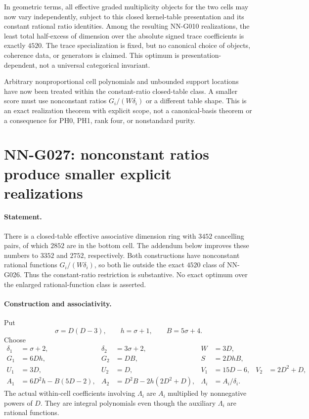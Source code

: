 In geometric terms, all effective graded multiplicity objects
for the two cells may now vary independently, subject to this
closed kernel-table presentation and its constant rational
ratio identities. Among the resulting NN-G010 realizations,
the least total half-excess of dimension over the absolute
signed trace coefficients is exactly $4520$. The trace
specialization is fixed, but no canonical choice of objects,
coherence data, or generators is claimed. This optimum is
presentation-dependent, not a universal categorical invariant.

Arbitrary nonproportional cell polynomials and
unbounded support locations have now been treated
within the constant-ratio closed-table class. A
smaller score must use nonconstant ratios
$G_i/(W\delta_i)$ or a different table shape.
This is an exact realization theorem with explicit
scope, not a canonical-basis theorem or a consequence
for PH0, PH1, rank four, or nonstandard purity.



\section{NN-G027: nonconstant ratios produce smaller explicit realizations}
\paragraph{Statement.}
There is a closed-table effective associative dimension ring
with $3452$ cancelling pairs, of which $2852$ are in the
bottom cell. The addendum below improves these numbers to
$3352$ and $2752$, respectively. Both constructions have
nonconstant rational functions
$G_i/(W\delta_i)$, so both lie outside the exact $4520$
class of NN-G026. Thus the constant-ratio restriction is
substantive. No exact optimum over the enlarged rational-function
class is asserted.

\paragraph{Construction and associativity.}
Put
\[
 \sigma=D(D-3),\qquad h=\sigma+1,\qquad B=5\sigma+4.
\]
Choose
\[
 \begin{aligned}
 \delta_1&=\sigma+2,&\delta_2&=3\sigma+2,&W&=3D,\\
 G_1&=6Dh,&G_2&=DB,&S&=2DhB,\\
 U_1&=3D,&U_2&=D,&V_1&=15D-6,&V_2&=2D^2+D,\\
 A_1&=6D^2h-B(5D-2),&
 A_2&=D^2B-2h(2D^2+D),&
 \Lambda_i&=A_i/\delta_i.
 \end{aligned}                                                       \tag{G027.1}
\]
The actual within-cell coefficients involving $\Lambda_i$
are $A_i$ multiplied by nonnegative powers of $D$.
They are integral polynomials even though the auxiliary
$\Lambda_i$ are rational functions.

